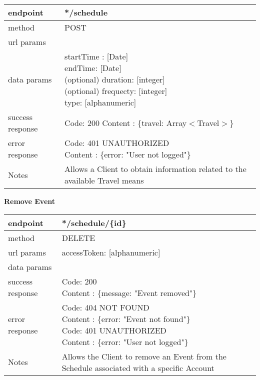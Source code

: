 \begin{tabularx}{\linewidth}{| l | l |}
	\hline
	endpoint & */schedule \\
	\hline
	method & POST \\
	\hline
	url params & \\
	\hline
	data params &
	\parbox{0.7\textwidth}{
		\bigskip
		startTime : [Date]\\
		endTime: [Date] \\
		(optional) duration: [integer]\\
		(optional) frequecty: [integer]\\
		type: [alphanumeric]\\
		\bigskip
	} \\
	\hline
	success response &
	\parbox{0.7\textwidth}{
		\bigskip
		Code: 200\\
		Content : \{travel: Array$<$Travel$>$\}
		\bigskip
	} \\
	\hline
	error response &
	\parbox{0.7\textwidth}{
		\bigskip
		Code: 401 UNAUTHORIZED \\
		Content : \{error: "User not logged"\}
		\bigskip
	} \\
	\hline
	Notes & 
	\parbox{0.7\textwidth}{
	\bigskip Allows a Client to obtain information related to the available Travel means
	\bigskip}  \\
	\hline
\end{tabularx}

\textbf{Remove Event}

\begin{tabularx}{\linewidth}{| l | l |}
	\hline
	endpoint & */schedule/\{id\} \\
	\hline
	method & DELETE \\
	\hline
	url params &	\parbox{0.7\textwidth}{
		\bigskip
		accessToken: [alphanumeric] \\
	} \\
	\hline
	data params & \\
	\hline
	success response &
	\parbox{0.7\textwidth}{
		\bigskip
		Code: 200\\
		Content : \{message: "Event removed"\}
		\bigskip
	} \\
	\hline
	error response &
	\parbox{0.7\textwidth}{
		\bigskip
		Code: 404 NOT FOUND \\
		Content : \{error: "Event not found"\}\\
		Code: 401 UNAUTHORIZED \\
		Content : \{error: "User not logged"\}
		\bigskip
		\bigskip
	} \\
	\hline
	Notes & 
	\parbox{0.7\textwidth}{
	\bigskip
	Allows the Client to remove an Event from the Schedule associated with a specific Account
	\bigskip}\\
	\hline
\end{tabularx}

